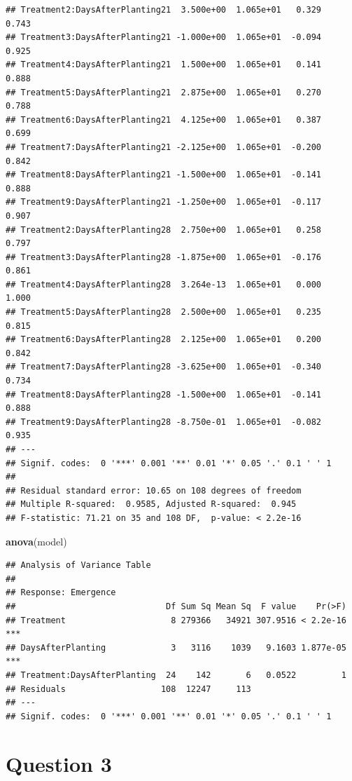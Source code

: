 \documentclass[
]{article}
\newenvironment{Shaded}{\begin{snugshade}}{\end{snugshade}}
\newcommand{\FunctionTok}[1]{\textcolor[rgb]{0.13,0.29,0.53}{\textbf{#1}}}
\newcommand{\NormalTok}[1]{#1}
\begin{document}
\begin{verbatim}
## Treatment2:DaysAfterPlanting21  3.500e+00  1.065e+01   0.329    0.743    
## Treatment3:DaysAfterPlanting21 -1.000e+00  1.065e+01  -0.094    0.925    
## Treatment4:DaysAfterPlanting21  1.500e+00  1.065e+01   0.141    0.888    
## Treatment5:DaysAfterPlanting21  2.875e+00  1.065e+01   0.270    0.788    
## Treatment6:DaysAfterPlanting21  4.125e+00  1.065e+01   0.387    0.699    
## Treatment7:DaysAfterPlanting21 -2.125e+00  1.065e+01  -0.200    0.842    
## Treatment8:DaysAfterPlanting21 -1.500e+00  1.065e+01  -0.141    0.888    
## Treatment9:DaysAfterPlanting21 -1.250e+00  1.065e+01  -0.117    0.907    
## Treatment2:DaysAfterPlanting28  2.750e+00  1.065e+01   0.258    0.797    
## Treatment3:DaysAfterPlanting28 -1.875e+00  1.065e+01  -0.176    0.861    
## Treatment4:DaysAfterPlanting28  3.264e-13  1.065e+01   0.000    1.000    
## Treatment5:DaysAfterPlanting28  2.500e+00  1.065e+01   0.235    0.815    
## Treatment6:DaysAfterPlanting28  2.125e+00  1.065e+01   0.200    0.842    
## Treatment7:DaysAfterPlanting28 -3.625e+00  1.065e+01  -0.340    0.734    
## Treatment8:DaysAfterPlanting28 -1.500e+00  1.065e+01  -0.141    0.888    
## Treatment9:DaysAfterPlanting28 -8.750e-01  1.065e+01  -0.082    0.935    
## ---
## Signif. codes:  0 '***' 0.001 '**' 0.01 '*' 0.05 '.' 0.1 ' ' 1
## 
## Residual standard error: 10.65 on 108 degrees of freedom
## Multiple R-squared:  0.9585, Adjusted R-squared:  0.945 
## F-statistic: 71.21 on 35 and 108 DF,  p-value: < 2.2e-16
\end{verbatim}

\begin{Shaded}
\begin{Highlighting}[]
\FunctionTok{anova}\NormalTok{(model)}
\end{Highlighting}
\end{Shaded}

\begin{verbatim}
## Analysis of Variance Table
## 
## Response: Emergence
##                              Df Sum Sq Mean Sq  F value    Pr(>F)    
## Treatment                     8 279366   34921 307.9516 < 2.2e-16 ***
## DaysAfterPlanting             3   3116    1039   9.1603 1.877e-05 ***
## Treatment:DaysAfterPlanting  24    142       6   0.0522         1    
## Residuals                   108  12247     113                       
## ---
## Signif. codes:  0 '***' 0.001 '**' 0.01 '*' 0.05 '.' 0.1 ' ' 1
\end{verbatim}

\section{Question 3}\label{question-3}
\end{document}
